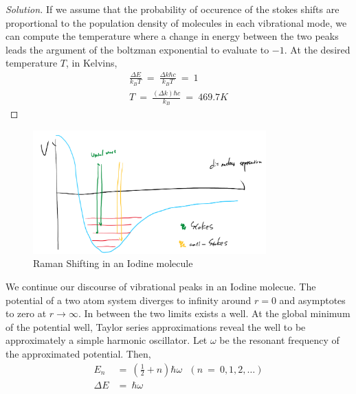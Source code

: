 \documentclass[10pt]{article}
\numberwithin{equation}{section}
\numberwithin{theorem}{section}
\numberwithin{proposition}{section}
\numberwithin{lemma}{section}
\numberwithin{corollary}{section}
\numberwithin{remark}{section}
\numberwithin{definition}{section}
\numberwithin{example}{section}
\numberwithin{conjecture}{section}
\numberwithin{question}{section}
\begin{document}
\begin{proof}[Solution]
    If we assume that the probability of occurence 
    of the stokes shifts are proportional to the population 
    density of molecules in each vibrational mode, 
    we can compute the temperature where 
    a change in energy between the 
    two peaks leads the argument of the 
    boltzman exponential to evaluate to $-1$. 
    At the desired temperature $T$, in Kelvins, 
    \begin{align}
        \frac {\Delta E}{k_B T} 
        \ = \ \frac{\Delta k \hbar c}{k_B T}\ = \ 1 \\ 
        T \ = \ \frac {(\Delta k) \hbar c}{k_B } \ = \ \boxed{469.7 K}
    \end{align}
\end{proof}

\begin{figure}[htp]
    \centering
    \includegraphics[width=0.8\textwidth]{EnergyLevels.png} %
    \caption{Raman Shifting in an Iodine molecule}
    \label{fig:example}
\end{figure}

We continue our discourse of vibrational peaks in an Iodine molecue. 
The potential of a two atom system diverges to infinity around $r = 0$ 
and asymptotes to zero at $r \rightarrow \infty$. In between the 
two limits exists a well. At the global minimum of the potential well, 
Taylor series approximations reveal the well to be approximately a 
simple harmonic oscillator. Let $\omega$ be the resonant frequency 
of the approximated potential. Then, 
\begin{align}
    E_n & = \ (\frac 1 2 + n) \hbar \omega \ \ \ (n \ = \ 0, 1, 2, \dots) \\
    \Delta E & = \ \hbar \omega
\end{align}
\end{document}

